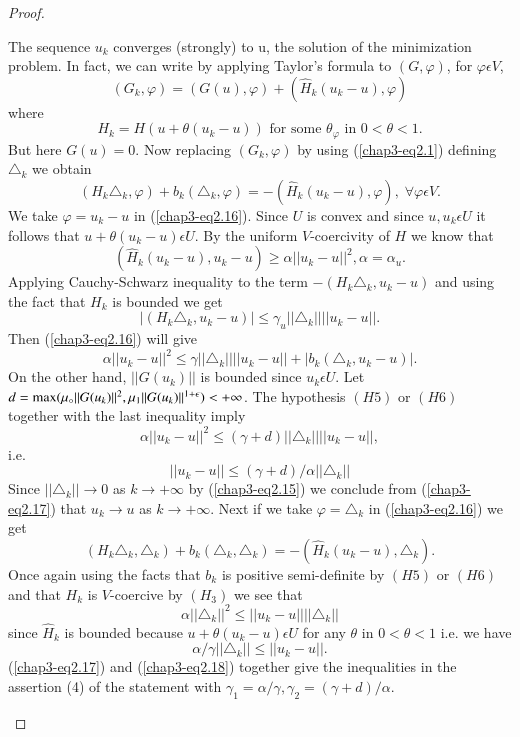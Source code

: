 \begin{proof}
\begin{step}%
The sequence $u_{k}$ converges (strongly) to u, the solution of the minimization problem. In fact, we can write by applying Taylor's formula to $(G, \varphi)$, for $\varphi \epsilon V$,
$$
(G_{k}, \varphi) = (G(u), \varphi) + (\hat{H}_{k} (u_{k}-u), \varphi)
$$
where
$$
H_{k} = H(u+\theta(u_{k}-u)) \text{ for some } \theta_{\varphi} \text{ in }  0 <  \theta < 1.
$$
But here $G(u) = 0$. Now replacing $(G_{k}, \varphi)$ by using (\ref{chap3-eq2.1}) defining $\triangle_{k}$ we obtain
\begin{equation*}
(H_{k} \triangle_{k}, \varphi) + b_{k} (\triangle_{k}, \varphi) = -(\hat{H}_{k} (u_{k}-u), \varphi), \; \forall \varphi \epsilon V.\tag{2.16}\label{chap3-eq2.16}
\end{equation*}
We take $\varphi = u_{k}-u$ in (\ref{chap3-eq2.16}). Since $U$ is convex and since $u, u_{k} \epsilon U$ it follows that $u + \theta(u_{k}-u) \epsilon U$. By the uniform $V$-coercivity of $H$ we know that
$$
(\hat{H}_{k} (u_{k}-u), u_{k}-u) \geq \alpha ||u_{k}-u||^{2}, \alpha = \alpha_{u}.
$$
Applying Cauchy-Schwarz inequality to the term $-(H_{k} \triangle_{k}, u_{k}-u)$ and using the fact that $H_{k}$ is bounded we get
$$
|(H_{k} \triangle_{k}, u_{k}-u)| \leq \gamma_{u} ||\triangle_{k}|| ||u_{k}-u||.
$$
Then (\ref{chap3-eq2.16}) will give
$$
\alpha ||u_{k}-u||^{2} \leq \gamma ||\triangle_{k}|| ||u_{k}-u|| + |b_{k}(\triangle_{k}, u_{k}-u)|.
$$
On the other hand, $||G(u_{k})||$ is bounded since $u_{k} \epsilon
U$. Let $d = \max (\mu_{\circ}\break ||G(u_{k})||^{2},
\mu_{1}||G(u_{k})||^{1+\epsilon}) < + \infty$. The hypothesis $(H5)$
or $(H6)$ together with the last inequality imply 
$$
\alpha ||u_{k}-u||^{2} \leq (\gamma+d)|| \triangle_{k} || ||u_{k}-u||,
$$
i.e. 
\begin{equation*}
||u_{k}-u|| \leq (\gamma+d) / \alpha ||\triangle_{k}||\tag{2.17}\label{chap3-eq2.17}
\end{equation*}\pageoriginale
Since $||\triangle_{k}|| \to 0$ as $k \to + \infty$ by (\ref{chap3-eq2.15}) we conclude from (\ref{chap3-eq2.17}) that $u_{k} \to u$ as $k \to + \infty$. Next if we take $\varphi = \triangle_{k}$ in (\ref{chap3-eq2.16}) we get
$$
(H_{k} \triangle_{k}, \triangle_{k}) + b_{k} (\triangle_{k}, \triangle_{k}) = -(\hat{H}_{k}(u_{k}-u), \triangle_{k}).
$$ 
Once again using the facts that $b_{k}$ is positive semi-definite by $(H5)$ or $(H6)$ and that $H_{k}$ is $V$-coercive by $(H_{3})$ we see that
$$
\alpha ||\triangle_{k}||^{2} \leq ||u_{k}-u|| ||\triangle_{k}||
$$
since $\hat{H}_{k}$ is bounded because $u+\theta(u_{k}-u) \epsilon U$ for any $\theta$ in $0 < \theta < 1$ i.e. we have
\begin{equation*}
\alpha / \gamma ||\triangle_{k}|| \leq ||u_{k}-u||.\tag{2.18}\label{chap3-eq2.18}
\end{equation*}
(\ref{chap3-eq2.17}) and (\ref{chap3-eq2.18}) together give the inequalities in the assertion (4) of the statement with $\gamma_{1} = \alpha/\gamma, \gamma_{2} = (\gamma + d)/ \alpha.$
\end{step}


\end{proof}
